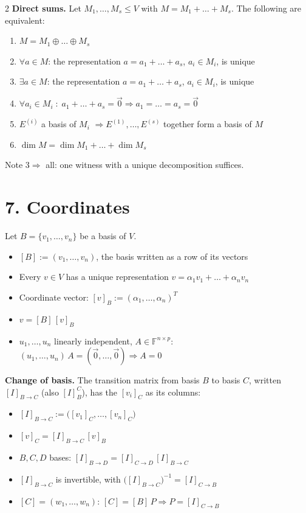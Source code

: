 \documentclass[fleqn]{article}
\newcommand{\subhead}[1]{\medskip\noindent\textbf{#1}}
\begin{document}
\begin{multicols}{2}
\subhead{Direct sums.}
Let $M_1,\dots,M_s \le V$ with $M=M_1+\dots+M_s$. The following are equivalent:
\begin{enumerate}
\item $M = M_1 \oplus \dots \oplus M_s$
\item $\forall a \in M$: the representation $a=a_1+\dots+a_s$, $a_i \in M_i$, is unique
\item $\exists a \in M$: the representation $a=a_1+\dots+a_s$, $a_i \in M_i$, is unique
\item $\forall a_i \in M_i \;:\; a_1+\dots+a_s=\vec{0} \Rightarrow a_1=\dots=a_s=\vec{0}$
\item $E^{(i)}$ a basis of $M_i$ $\Rightarrow E^{(1)},\dots,E^{(s)}$ together form a basis of $M$
\item $\dim M = \dim M_1 + \dots + \dim M_s$
\end{enumerate}
Note $3 \Rightarrow$ all: one witness with a unique decomposition suffices.

\vspace{-3ex}
\section*{7. Coordinates}
Let $B=\{v_1,\dots,v_n\}$ be a basis of $V$.
\begin{itemize}
\item $[B] := (v_1, \dots, v_n)$, the basis written as a row of its vectors
\item Every $v \in V$ has a unique representation $v = \alpha_1 v_1 + \dots + \alpha_n v_n$
\item Coordinate vector: $[v]_B := (\alpha_1,\dots,\alpha_n)^T$
\item {\color{red}$v = [B]\,[v]_B$}
\item $u_1,\dots,u_n$ linearly independent, $A \in \mathbb{F}^{n\times p}$: $(u_1, \dots, u_n)\,A = (\vec{0}, \dots, \vec{0}) \Rightarrow A = 0$
\end{itemize}

\subhead{Change of basis.}
The transition matrix from basis $B$ to basis $C$, written $[I]_{B \to C}$ (also $[I]_B^C$), has the $[v_i]_C$ as its columns:
\begin{itemize}
\item $[I]_{B \to C} := \big([v_1]_C, \dots, [v_n]_C\big)$
\item $[v]_C = [I]_{B \to C}\,[v]_B$
\item $B,C,D$ bases: $[I]_{B \to D} = [I]_{C \to D}\,[I]_{B \to C}$
\item $[I]_{B \to C}$ is invertible, with $\big([I]_{B \to C}\big)^{-1} = [I]_{C \to B}$
\item $[C]=(w_1, \dots, w_n)$: $[C]=[B]\,P \Rightarrow P = [I]_{C \to B}$
\end{itemize}


\end{multicols}
\end{document}
